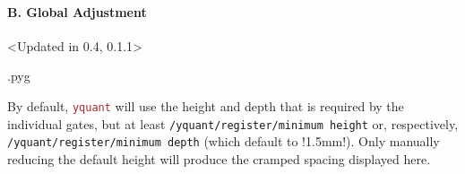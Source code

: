 \documentclass{scrartcl}
\makeatletter
\newenvironment{codeexample}{%
   \VerbatimEnvironment%
   \let\FVB@VerbatimOut\minted@FVB@VerbatimOut
   \let\FVE@VerbatimOut\minted@FVE@VerbatimOut
   \minted@configlang{tex}%
   \minted@fvset
   \begin{VerbatimOut}[codes={\catcode`\^^I=12},firstline,lastline]{\minted@jobname.pyg}%
}{
   \end{VerbatimOut}%
   \minted@langlinenoson%
   \savebox\codeexamplebox{ \minted@jobname.pyg}%
   \ifdim\wd\codeexamplebox>\dimexpr.5\linewidth-3mm\relax%
      \wd\codeexamplebox=.5\linewidth%
   \else%
      \wd\codeexamplebox=\dimexpr\wd\codeexamplebox+3mm\relax%
   \fi%
   \noindent\begin{minipage}{\wd\codeexamplebox}%
      \centering%
      \usebox\codeexamplebox%
   \end{minipage}%
   \begin{minipage}{\dimexpr\linewidth-\wd\codeexamplebox\relax}%
      \expandafter\minted@pygmentize\expandafter{\minted@lang}%
   \end{minipage}%
   \minted@langlinenosoff%
   \par%
}
\newenvironment{codeexample*}{%
   \VerbatimEnvironment%
   \let\FVB@VerbatimOut\minted@FVB@VerbatimOut
   \let\FVE@VerbatimOut\minted@FVE@VerbatimOut
   \minted@configlang{tex}%
   \minted@fvset
   \begin{VerbatimOut}[codes={\catcode`\^^I=12},firstline,lastline]{\minted@jobname.pyg}%
}{
   \end{VerbatimOut}%
   \minted@langlinenoson%
   \begin{adjustbox}{center}
       \minted@jobname.pyg %
   \end{adjustbox}\nopagebreak
   \expandafter\minted@pygmentize\expandafter{\minted@lang}%
   \minted@langlinenosoff%
   \par%
}
\def\pkg#1{\textcolor{brown}{\texttt{#1}}}
\def\ttlink{\link\texttt}
\def\Yquant{\pkg{yquant}}
\makeatother
\begin{document}
            \clearpage
            \paragraph{B. Global Adjustment}\leavevmode
               \begin{example}
                  \begin{codeexample*}
                  \end{codeexample*}
               \end{example}

               \begin{example}<Updated in 0.4, 0.1.1>
                  \begin{codeexample}
                  \end{codeexample}
                  By default, \Yquant{} will use the height and depth that is required by the individual gates, but at least \ttlink{/yquant/register/minimum height} or, respectively, \ttlink{/yquant/register/minimum depth} (which default to \tex!1.5mm!).
                  Only manually reducing the default height will produce the cramped spacing displayed here.
               \end{example}

            \clearpage
\end{document}
